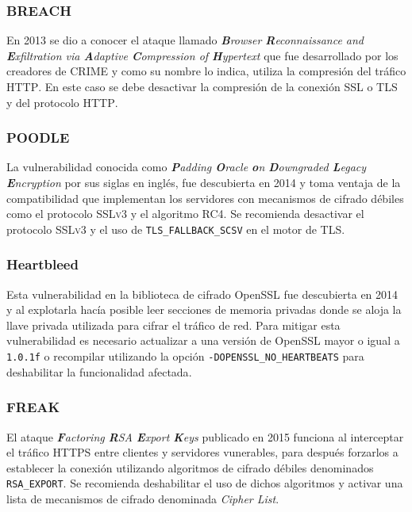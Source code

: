         \subsubsection{BREACH}

En 2013 se dio a conocer el ataque llamado \emph{\textbf{B}rowser \textbf{R}econnaissance and \textbf{E}xfiltration via \textbf{A}daptive \textbf{C}ompression of \textbf{H}ypertext} que fue desarrollado por los creadores de \textsc{CRIME} y como su nombre lo indica, utiliza la compresi\'{o}n del tr\'{a}fico \textsc{\gls{HTTP}}. En este caso se debe desactivar la compresi\'{o}n de la conexi\'{o}n \textsc{\gls{SSL}} o \textsc{\gls{TLS}} y del protocolo \textsc{\gls{HTTP}}\cite{_breach_????}.

        \subsubsection{POODLE}

La vulnerabilidad conocida como \emph{\textbf{P}adding \textbf{O}racle \textbf{o}n \textbf{D}owngraded \textbf{L}egacy \textbf{E}ncryption} por sus siglas en ingl\'{e}s, fue descubierta en 2014 y toma ventaja de la compatibilidad que implementan los servidores con mecanismos de cifrado d\'{e}biles como el protocolo \textsc{SSLv3} y el algoritmo \textsc{RC4}. Se recomienda desactivar el protocolo \textsc{SSLv3} y el uso de \texttt{TLS\_FALLBACK\_SCSV} en el motor de \textsc{\gls{TLS}}\cite{_ssl-poodle.pdf_????}.

        \subsubsection{Heartbleed}

Esta vulnerabilidad en la biblioteca de cifrado OpenSSL fue descubierta en 2014 y al explotarla hac\'{i}a posible leer secciones de memoria privadas donde se aloja la llave privada utilizada para cifrar el tr\'{a}fico de red\cite{_heartbleed_????}. Para mitigar esta vulnerabilidad es necesario actualizar a una versi\'{o}n de OpenSSL mayor o igual a \texttt{1.0.1f} o recompilar utilizando la opci\'{o}n \texttt{-DOPENSSL\_NO\_HEARTBEATS} para deshabilitar la funcionalidad afectada\cite{_vulnerabilidad_????}.

        \subsubsection{FREAK}

El ataque \emph{\textbf{F}actoring \textbf{R}SA \textbf{E}xport \textbf{K}eys} publicado en 2015 funciona al interceptar el tr\'{a}fico \textsc{\gls{HTTPS}} entre clientes y servidores vunerables, para despu\'{e}s forzarlos a establecer la conexi\'{o}n utilizando algoritmos de cifrado d\'{e}biles denominados \texttt{RSA\_EXPORT}. Se recomienda deshabilitar el uso de dichos algoritmos y activar una lista de mecanismos de cifrado denominada \emph{Cipher List}\cite{_tracking_????}.

